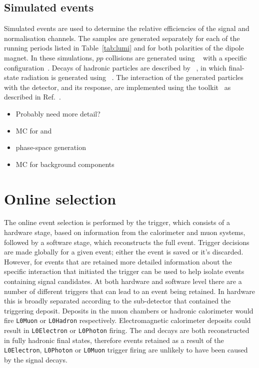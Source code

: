 \subsection{Simulated events}
\label{sec:mc}

Simulated events are used to determine the relative efficiencies of the signal and normalisation channels. 
The samples are generated separately for each of the running periods listed in Table~\ref{tab:lumi} and for both polarities of the \lhcb dipole magnet. In these simulations, $pp$ collisions are generated using \pythia~\cite{Sjostrand:2007gs,Sjostrand:2006za} with a specific \lhcb configuration~\cite{LHCb-PROC-2010-056}.  Decays of hadronic particles are described by \evtgen~\cite{Lange:2001uf}, in which final-state radiation is generated using \photos~\cite{Golonka:2005pn}. The interaction of the generated particles with the detector, and its response, are implemented using the \geant toolkit~\cite{Allison:2006ve, *Agostinelli:2002hh} as described in Ref.~\cite{LHCb-PROC-2011-006}.

{\color{Red}
\begin{itemize}
\item Probably need more detail?
\item MC for \decay{\Bp}{\Dsp\phiz} and \decay{\Bp}{\Dsp\Kp\Km}
\item phase-space generation
\item MC for background components
\end{itemize}
}

\section{Online selection}

The online event selection is performed by the \lhcb trigger, which consists of a hardware stage, based on information from the calorimeter and muon
systems, followed by a software stage, which reconstructs the full event.
Trigger decisions are made globally for a given event; either the event is saved or it's discarded. However, for events that are retained more detailed information about the specific interaction that initiated the trigger can be used to help isolate events containing signal candidates. At both hardware and software level there are a number of different triggers that can lead to an event being retained. In hardware this is broadly separated according to the sub-detector that contained the triggering deposit. Deposits in the muon chambers or hadronic calorimeter would fire \texttt{L0Muon} or \texttt{L0Hadron} respectively. Electromagnetic calorimeter deposits could result in \texttt{L0Electron} or \texttt{L0Photon} firing. The \decay{\Bp}{\Dsp\Kp\Km} and \decay{\Bp}{\Dsp}{\phiz} decays are both reconstructed in fully hadronic final states, therefore events retained as a result of the \texttt{L0Electron}, \texttt{L0Photon} or \texttt{L0Muon} trigger firing are unlikely to have been caused by the signal decays. 

